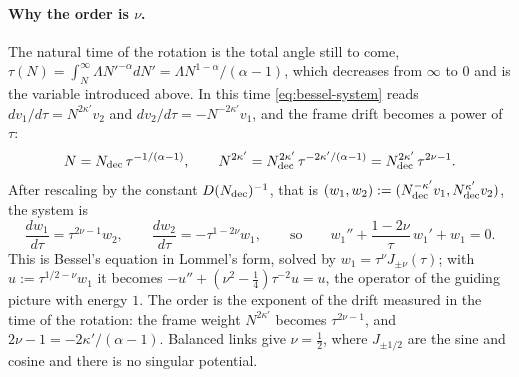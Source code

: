 \paragraph{Why the order is $\nu$.} The natural time of the rotation is the total angle
still to come, $\tau(N)=\int_N^\infty\Lambda N'^{-\alpha}dN'=\Lambda N^{1-\alpha}/(\alpha-1)$, which
decreases from $\infty$ to $0$ and is the variable introduced above. In this time
\eqref{eq:bessel-system} reads $dv_1/d\tau=N^{2\kappa'}v_2$ and $dv_2/d\tau=-N^{-2\kappa'}v_1$, and
the frame drift becomes a power of $\tau$:
\[
  N=N_{\rm dec}\,\tau^{-1/(\alpha-1)},\qquad N^{2\kappa'}=N_{\rm dec}^{2\kappa'}\,\tau^{-2\kappa'/(\alpha-1)}=N_{\rm dec}^{2\kappa'}\,\tau^{2\nu-1}.
\]
After rescaling by the constant $D(N_{\rm dec})^{-1}$, that is
$(w_1,w_2):=(N_{\rm dec}^{-\kappa'}v_1,N_{\rm dec}^{\kappa'}v_2)$, the system is
\[
  \frac{dw_1}{d\tau}=\tau^{2\nu-1}w_2,\qquad \frac{dw_2}{d\tau}=-\tau^{1-2\nu}w_1,
  \qquad\text{so}\qquad
  w_1''+\frac{1-2\nu}{\tau}\,w_1'+w_1=0 .
\]
This is Bessel's equation in Lommel's form, solved by $w_1=\tau^\nu J_{\pm\nu}(\tau)$; with
$u:=\tau^{1/2-\nu}w_1$ it becomes $-u''+(\nu^2-\frac14)\tau^{-2}u=u$, the operator of the
guiding picture with energy $1$. The order is the exponent of the drift measured in the
time of the rotation: the frame weight $N^{2\kappa'}$ becomes $\tau^{2\nu-1}$, and
$2\nu-1=-2\kappa'/(\alpha-1)$. Balanced links give $\nu=\frac12$, where $J_{\pm1/2}$ are the
sine and cosine and there is no singular potential.


